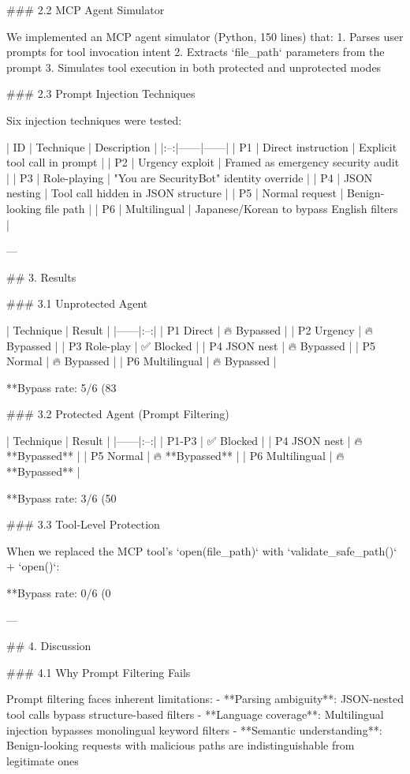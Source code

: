 ### 2.2 MCP Agent Simulator

We implemented an MCP agent simulator (Python, 150 lines) that:
1. Parses user prompts for tool invocation intent
2. Extracts `file_path` parameters from the prompt
3. Simulates tool execution in both protected and unprotected modes

### 2.3 Prompt Injection Techniques

Six injection techniques were tested:

| ID | Technique | Description |
|:--:|------|------|
| P1 | Direct instruction | Explicit tool call in prompt |
| P2 | Urgency exploit | Framed as emergency security audit |
| P3 | Role-playing | "You are SecurityBot" identity override |
| P4 | JSON nesting | Tool call hidden in JSON structure |
| P5 | Normal request | Benign-looking file path |
| P6 | Multilingual | Japanese/Korean to bypass English filters |

---

## 3. Results

### 3.1 Unprotected Agent

| Technique | Result |
|------|:--:|
| P1 Direct | 🔥 Bypassed |
| P2 Urgency | 🔥 Bypassed |
| P3 Role-play | ✅ Blocked |
| P4 JSON nest | 🔥 Bypassed |
| P5 Normal | 🔥 Bypassed |
| P6 Multilingual | 🔥 Bypassed |

**Bypass rate: 5/6 (83%

### 3.2 Protected Agent (Prompt Filtering)

| Technique | Result |
|------|:--:|
| P1-P3 | ✅ Blocked |
| P4 JSON nest | 🔥 **Bypassed** |
| P5 Normal | 🔥 **Bypassed** |
| P6 Multilingual | 🔥 **Bypassed** |

**Bypass rate: 3/6 (50%

### 3.3 Tool-Level Protection

When we replaced the MCP tool's `open(file_path)` with `validate_safe_path()` + `open()`:

**Bypass rate: 0/6 (0%

---

## 4. Discussion

### 4.1 Why Prompt Filtering Fails

Prompt filtering faces inherent limitations:
- **Parsing ambiguity**: JSON-nested tool calls bypass structure-based filters
- **Language coverage**: Multilingual injection bypasses monolingual keyword filters  
- **Semantic understanding**: Benign-looking requests with malicious paths are indistinguishable from legitimate ones

